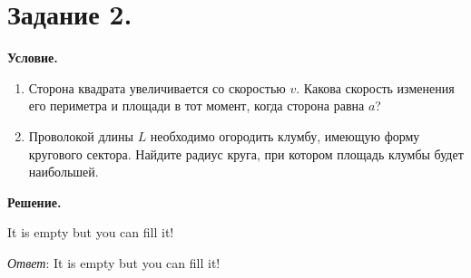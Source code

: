 \section{Задание 2.}

\textbf{Условие.}\\
\begin{enumerate}
    \item Сторона квадрата увеличивается со скоростью $v$.
    Какова скорость изменения его периметра и площади в тот момент, когда сторона равна $a$?
    \item Проволокой длины $L$ необходимо огородить клумбу, имеющую форму кругового сектора.
    Найдите радиус круга, при котором площадь клумбы будет наибольшей.
\end{enumerate}

\vspace{10mm}
\textbf{Решение.}

It is empty but you can fill it!

\textit{Ответ}: It is empty but you can fill it!
\clearpage
